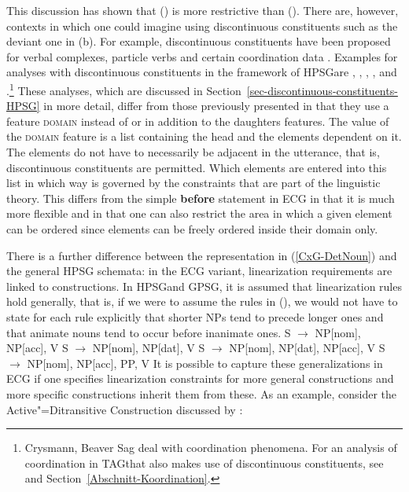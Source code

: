 This discussion has shown that () is more restrictive than (). There are, however, contexts in which one could imagine using
discontinuous constituents such as the deviant one in (b). For example, discontinuous constituents have been
proposed for verbal complexes, particle verbs and certain coordination data \citep{Wells47a}. 
Examples for analyses with discontinuous constituents in the framework of HPSG\indexhpsg are
, , , , and .\footnote{%
	Crysmann, Beaver \biband Sag deal with coordination phenomena. For an analysis of coordination in TAG\indextag that also makes use of
	discontinuous constituents, see    and Section~\ref{Abschnitt-Koordination}.%
} These analyses, which are discussed in Section~\ref{sec-discontinuous-constituents-HPSG} in more
detail, differ from those previously presented in that they use a feature
\textsc{domain} instead of or in addition to the daughters features. The value of the
\textsc{domain} feature is a list containing the head and the elements dependent on it.
The elements do not have to necessarily be adjacent in the utterance, that is, discontinuous constituents are permitted.
Which elements are entered into this list in which way is governed by the constraints that are part of the linguistic theory.
This differs from the simple \textbf{before} statement in ECG in that it is much more flexible and
in that one can also restrict the area in which a given element can be ordered
since elements can be freely ordered inside their domain only.

There is a further difference between the representation in (\ref{CxG-DetNoun}) and the general HPSG
schemata: in the ECG variant, linearization
requirements are linked to constructions. In HPSG\indexhpsg and GPSG\indexgpsg, it is assumed that linearization rules
hold generally, that is, if we were to assume the rules in (), we would not have to state for each rule explicitly that shorter NPs tend to precede
longer ones and that animate nouns tend to occur before inanimate ones.
\eal
\ex S $\to$ NP[nom], NP[acc], V
\ex S $\to$ NP[nom], NP[dat], V
\ex S $\to$ NP[nom], NP[dat], NP[acc], V
\ex S $\to$ NP[nom], NP[acc], PP, V
\zl
It is possible to capture these generalizations in ECG if one specifies linearization constraints for more general constructions and more specific constructions
inherit them from these. As an example, consider the Active"=Ditransitive Construction discussed by
\citet[]{BC2005a}:

